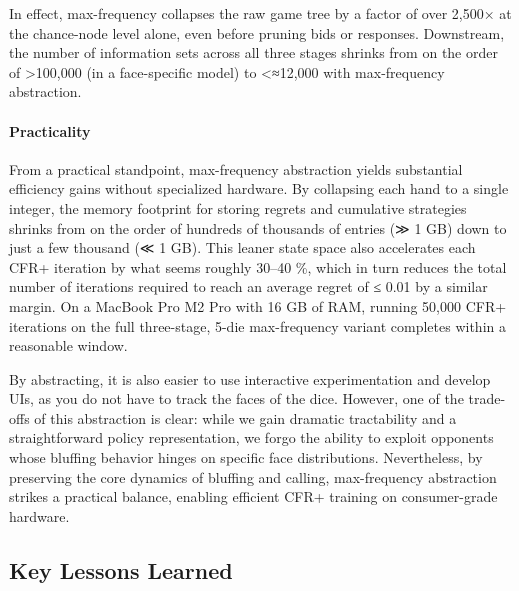 \documentclass[
]{article}
\begin{document}
In effect, max-frequency collapses the raw game tree by a factor of over
2,500× at the chance-node level alone, even before pruning bids or
responses. Downstream, the number of information sets across all three
stages shrinks from on the order of \textgreater100,000 (in a
face-specific model) to \textless≈12,000 with max-frequency abstraction.

\paragraph{\texorpdfstring{\textbf{Practicality}}{Practicality}}\label{practicality}

From a practical standpoint, max-frequency abstraction yields
substantial efficiency gains without specialized hardware. By collapsing
each hand to a single integer, the memory footprint for storing regrets
and cumulative strategies shrinks from on the order of hundreds of
thousands of entries (≫ 1 GB) down to just a few thousand (≪ 1 GB). This
leaner state space also accelerates each CFR+ iteration by what seems
roughly 30--40 \%, which in turn reduces the total number of iterations
required to reach an average regret of ≤ 0.01 by a similar margin. On a
MacBook Pro M2 Pro with 16 GB of RAM, running 50,000 CFR+ iterations on
the full three-stage, 5-die max-frequency variant completes within a
reasonable window.

By abstracting, it is also easier to use interactive experimentation and
develop UIs, as you do not have to track the faces of the dice. However,
one of the trade-offs of this abstraction is clear: while we gain
dramatic tractability and a straightforward policy representation, we
forgo the ability to exploit opponents whose bluffing behavior hinges on
specific face distributions. Nevertheless, by preserving the core
dynamics of bluffing and calling, max-frequency abstraction strikes a
practical balance, enabling efficient CFR+ training on consumer-grade
hardware.

\subsection{\texorpdfstring{\textbf{Key Lessons
Learned}}{Key Lessons Learned}}\label{key-lessons-learned}
\end{document}
